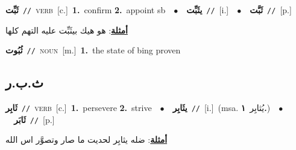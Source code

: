 \documentclass[10pt,a4paper,twoside]{article} %
\begin{document}
\begin{multicols}{2}
{\setlength\topsep{0pt}\textbf{\foreignlanguage{arabic}{ثَبِّت}}\ {\color{gray}\texttt{//}\color{black}}\ \textsc{verb}\ [c.]\ \textbf{1.}~confirm  \textbf{2.}~appoint sb\ \ $\bullet$\ \ \setlength\topsep{0pt}\textbf{\foreignlanguage{arabic}{يثَبِّت}}\ {\color{gray}\texttt{//}\color{black}}\ [i.]\ \ $\bullet$\ \ \setlength\topsep{0pt}\textbf{\foreignlanguage{arabic}{ثَبَّت}}\ {\color{gray}\texttt{//}\color{black}}\ [p.]\  \begin{flushright}\color{gray}\foreignlanguage{arabic}{\textbf{\underline{\foreignlanguage{arabic}{أمثلة}}}: هو هيك بيثَبِّت عليه التهم كلها}\end{flushright}\color{black}} \vspace{2mm}

{\setlength\topsep{0pt}\textbf{\foreignlanguage{arabic}{ثُبُوت}}\ {\color{gray}\texttt{//}\color{black}}\ \textsc{noun}\ [m.]\ \textbf{1.}~the state of bing proven\ 

\vspace{-3mm}
\subsection*{\color{blue}\foreignlanguage{arabic}{ث.ب.ر}\color{blue}{}} 

{\setlength\topsep{0pt}\textbf{\foreignlanguage{arabic}{ثَابِر}}\ {\color{gray}\texttt{//}\color{black}}\ \textsc{verb}\ [c.]\ \textbf{1.}~persevere  \textbf{2.}~strive\ \ $\bullet$\ \ \setlength\topsep{0pt}\textbf{\foreignlanguage{arabic}{يثَابِر}}\ {\color{gray}\texttt{//}\color{black}}\ [i.]\ \color{gray}(msa. \foreignlanguage{arabic}{يُثابِر}~\foreignlanguage{arabic}{\textbf{١.}})\color{black}\ \ $\bullet$\ \ \setlength\topsep{0pt}\textbf{\foreignlanguage{arabic}{ثَابَر}}\ {\color{gray}\texttt{//}\color{black}}\ [p.]\  \begin{flushright}\color{gray}\foreignlanguage{arabic}{\textbf{\underline{\foreignlanguage{arabic}{أمثلة}}}: ضله يثابِر لحديت ما صار وتصوَّر اس الله}\end{flushright}\color{black}} \vspace{2mm}

}
\end{multicols}
\end{document}
